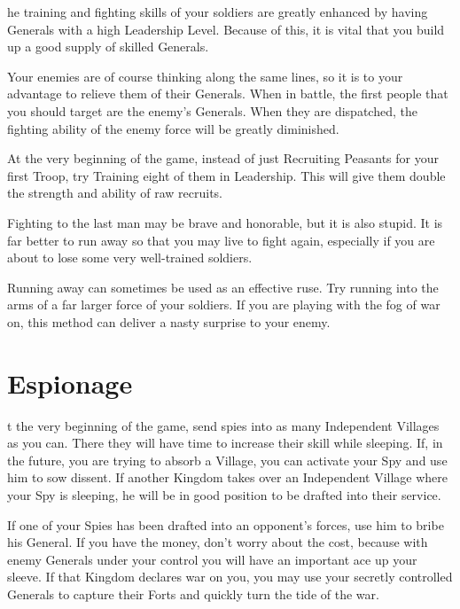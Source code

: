 
he training and fighting skills of your soldiers are greatly enhanced by having Generals with a high Leadership Level. Because of this, it is vital that you build up a good supply of skilled Generals.

Your enemies are of course thinking along the same lines, so it is to your advantage to relieve them of their Generals. When in battle, the first people that you should target are the enemy’s Generals. When they are dispatched, the fighting ability of the enemy force will be greatly diminished.

At the very beginning of the game, instead of just Recruiting Peasants for your first Troop, try Training eight of them in Leadership. This will give them double the strength and ability of raw recruits.

Fighting to the last man may be brave and honorable, but it is also stupid. It is far better to run away so that you may live to fight again, especially if you are about to lose some very well-trained soldiers.

Running away can sometimes be used as an effective ruse. Try running into the arms of a far larger force of your soldiers. If you are playing with the fog of war on, this method can deliver a nasty surprise to your enemy.

\section{\textsf{Espionage}}


t the very beginning of the game, send spies into as many Independent Villages as you can. There they will have time to increase their skill while sleeping. If, in the future, you are trying to absorb a Village, you can activate your Spy and use him to sow dissent. If another Kingdom takes over an Independent Village where your Spy is sleeping, he will be in good position to be drafted into their service.

If one of your Spies has been drafted into an opponent’s forces, use him to bribe his General. If you have the money, don’t worry about the cost, because with enemy Generals under your control you will have an important ace up your sleeve. If that Kingdom declares war on you, you may use your secretly controlled Generals to capture their Forts and quickly turn the tide of the war.

